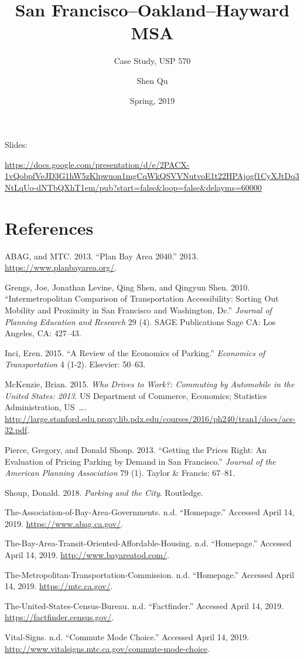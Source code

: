 \documentclass[12pt,]{article}
\title{San Francisco--Oakland--Hayward MSA}
\subtitle{Case Study, USP 570}
\author{Shen Qu}
\date{Spring, 2019}
\begin{document}
\maketitle

Slides:

\url{https://docs.google.com/presentation/d/e/2PACX-1vQobpfVeJD3G1hW5zKlpwuon1mgCqWkQSVVNutvoE1t22HPAjogf1CyXJtDq3NtLqUo-dNTbQXhT1em/pub?start=false\&loop=false\&delayms=60000}

\hypertarget{references}{%
\section*{References}\label{references}}

\hypertarget{refs}{}
\leavevmode\hypertarget{ref-ABAG2013plan}{}%
ABAG, and MTC. 2013. ``Plan Bay Area 2040.'' 2013.
\url{https://www.planbayarea.org/}.

\leavevmode\hypertarget{ref-grengs2010intermetropolitan}{}%
Grengs, Joe, Jonathan Levine, Qing Shen, and Qingyun Shen. 2010.
``Intermetropolitan Comparison of Transportation Accessibility: Sorting
Out Mobility and Proximity in San Francisco and Washington, Dc.''
\emph{Journal of Planning Education and Research} 29 (4). SAGE
Publications Sage CA: Los Angeles, CA: 427--43.

\leavevmode\hypertarget{ref-inci2015review}{}%
Inci, Eren. 2015. ``A Review of the Economics of Parking.''
\emph{Economics of Transportation} 4 (1-2). Elsevier: 50--63.

\leavevmode\hypertarget{ref-mckenzie2015drives}{}%
McKenzie, Brian. 2015. \emph{Who Drives to Work?: Commuting by
Automobile in the United States: 2013}. US Department of Commerce,
Economics; Statistics Administration, US~\ldots{}.
\url{http://large.stanford.edu.proxy.lib.pdx.edu/courses/2016/ph240/tran1/docs/acs-32.pdf}.

\leavevmode\hypertarget{ref-pierce2013getting}{}%
Pierce, Gregory, and Donald Shoup. 2013. ``Getting the Prices Right: An
Evaluation of Pricing Parking by Demand in San Francisco.''
\emph{Journal of the American Planning Association} 79 (1). Taylor \&
Francis: 67--81.

\leavevmode\hypertarget{ref-shoup2018parking}{}%
Shoup, Donald. 2018. \emph{Parking and the City}. Routledge.

\leavevmode\hypertarget{ref-ABAG}{}%
The-Association-of-Bay-Area-Governments. n.d. ``Homepage.'' Accessed
April 14, 2019. \url{https://www.abag.ca.gov/}.

\leavevmode\hypertarget{ref-TOAH}{}%
The-Bay-Area-Transit-Oriented-Affordable-Housing. n.d. ``Homepage.''
Accessed April 14, 2019. \url{http://www.bayareatod.com/}.

\leavevmode\hypertarget{ref-MTC}{}%
The-Metropolitan-Transportation-Commission. n.d. ``Homepage.'' Accessed
April 14, 2019. \url{https://mtc.ca.gov/}.

\leavevmode\hypertarget{ref-USCB}{}%
The-United-States-Census-Bureau. n.d. ``Factfinder.'' Accessed April 14,
2019. \url{https://factfinder.census.gov/}.

\leavevmode\hypertarget{ref-CMC}{}%
Vital-Signs. n.d. ``Commute Mode Choice.'' Accessed April 14, 2019.
\url{http://www.vitalsigns.mtc.ca.gov/commute-mode-choice}.
\end{document}
